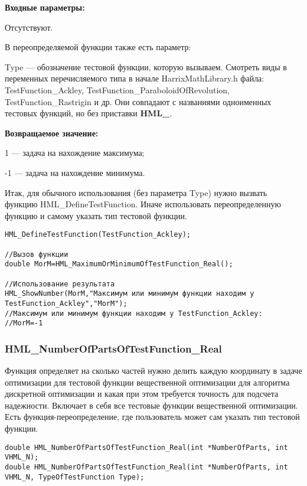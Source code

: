 \documentclass[a4paper,12pt]{article}
\begin{document}
\textbf{Входные параметры:}

Отсутствуют.

В переопределяемой функции также есть параметр:
  
Type --- обозначение тестовой функции, которую вызываем.
Смотреть виды в переменных перечисляемого типа в начале HarrixMathLibrary.h файла: TestFunction\_Ackley, TestFunction\_ParaboloidOfRevolution, TestFunction\_Rastrigin и др. Они совпадают с названиями одноименных тестовых функций, но без приставки \textbf{HML\_}.

\textbf{Возвращаемое значение:}
 
1 --- задача на нахождение максимума;

-1 --- задача на нахождение минимума.

Итак, для обычного использования (без параметра Type) нужно вызвать функцию HML\_DefineTestFunction. Иначе использовать переопределенную функцию и самому указать тип тестовой функции.


\begin{lstlisting}[label=code_use_HML_MaximumOrMinimumOfTestFunction_Real,caption=Пример использования]
HML_DefineTestFunction(TestFunction_Ackley);

//Вызов функции
double MorM=HML_MaximumOrMinimumOfTestFunction_Real();

//Использование результата
HML_ShowNumber(MorM,"Максимум или минимум функции находим у TestFunction_Ackley","MorM");
//Максимум или минимум функции находим у TestFunction_Ackley:
//MorM=-1
\end{lstlisting}

\subsubsection{HML\_NumberOfPartsOfTestFunction\_Real}\label{HML_NumberOfPartsOfTestFunction_Real}

Функция определяет на сколько частей нужно делить каждую координату в задаче оптимизации для тестовой функции вещественной оптимизации для алгоритма дискретной оптимизации и какая при этом требуется точность для подсчета надежности. Включает в себя все тестовые функции вещественной оптимизации. Есть функция-переопределение, где пользователь может сам указать тип тестовой функции.


\begin{lstlisting}[label=code_syntax_HML_NumberOfPartsOfTestFunction_Real,caption=Синтаксис]
double HML_NumberOfPartsOfTestFunction_Real(int *NumberOfParts, int VHML_N);
double HML_NumberOfPartsOfTestFunction_Real(int *NumberOfParts, int VHML_N, TypeOfTestFunction Type);
\end{lstlisting}
\end{document}
